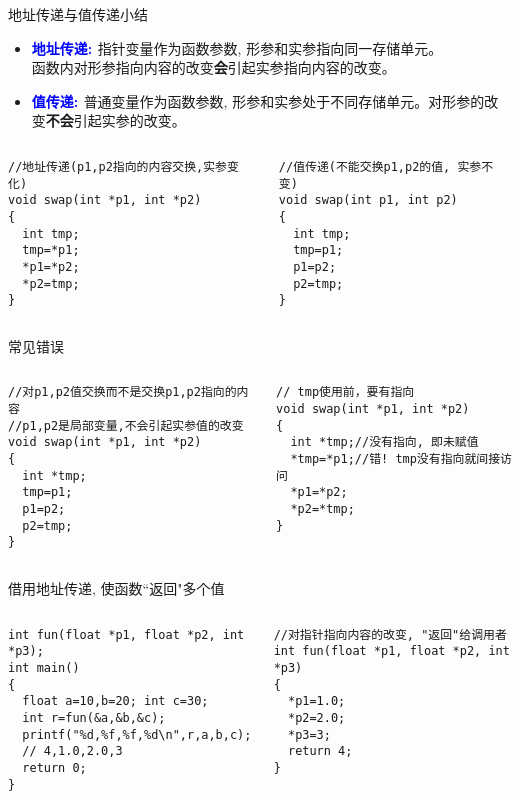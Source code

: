 \begin{frame}{地址传递与值传递小结}
\vspace{-0.2cm}
\begin{itemize}
	\item \textbf{\textcolor{blue}{地址传递: }}指针变量作为函数参数, 形参和实参指向同一存储单元。\\
	函数内对形参指向内容的改变\textbf{会}引起实参指向内容的改变。
	\item \textbf{\textcolor{blue}{值传递: }}普通变量作为函数参数, 形参和实参处于不同存储单元。对形参的改变\textbf{不会}引起实参的改变。
\end{itemize}
\vspace{-0.5cm}
\begin{columns}[T]
\begin{lstlisting}
//地址传递(p1,p2指向的内容交换,实参变化)
void swap(int *p1, int *p2)
{
  int tmp;
  tmp=*p1;
  *p1=*p2;
  *p2=tmp;
}
\end{lstlisting}
\begin{lstlisting}[frame=leftline]
//值传递(不能交换p1,p2的值, 实参不变)
void swap(int p1, int p2)
{
  int tmp;
  tmp=p1;
  p1=p2;
  p2=tmp;
}
\end{lstlisting}
\end{columns}
\medskip
\end{frame}

\begin{frame}{常见错误}
\begin{columns}[T]
\begin{lstlisting}
//对p1,p2值交换而不是交换p1,p2指向的内容 
//p1,p2是局部变量,不会引起实参值的改变
void swap(int *p1, int *p2)
{
  int *tmp;
  tmp=p1;
  p1=p2;
  p2=tmp;
}
\end{lstlisting}
\begin{lstlisting}[frame=leftline]
// tmp使用前，要有指向
void swap(int *p1, int *p2)
{
  int *tmp;//没有指向, 即未赋值
  *tmp=*p1;//错! tmp没有指向就间接访问
  *p1=*p2;
  *p2=*tmp;
}
\end{lstlisting}
\end{columns}
\medskip
\end{frame}

\begin{frame}{借用地址传递, 使函数``返回"多个值}
\begin{columns}[T]
\begin{lstlisting}
int fun(float *p1, float *p2, int *p3);
int main()
{
  float a=10,b=20; int c=30;
  int r=fun(&a,&b,&c);
  printf("%d,%f,%f,%d\n",r,a,b,c);
  // 4,1.0,2.0,3
  return 0;
}
\end{lstlisting}
\begin{lstlisting}[frame=leftline]
//对指针指向内容的改变, "返回"给调用者
int fun(float *p1, float *p2, int *p3)
{
  *p1=1.0;
  *p2=2.0;
  *p3=3;
  return 4;
}
\end{lstlisting}
\end{columns}
\medskip
\end{frame}

